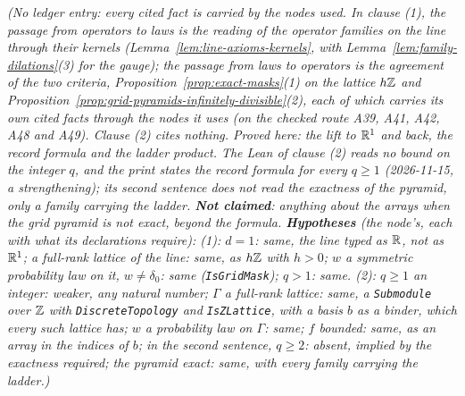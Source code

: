 \begin{proposition}[the line, and the arrays]
\statusT\quad\emph{(No ledger entry: every cited fact is carried by the nodes used. In clause (1),
the passage from operators to laws is the reading of the operator families on the line through
their kernels (Lemma~\ref{lem:line-axioms-kernels}, with Lemma~\ref{lem:family-dilations}(3) for
the gauge); the passage from laws to operators is the agreement of the two criteria,
Proposition~\ref{prop:exact-masks}(1) on the lattice $h\mathbb{Z}$ and
Proposition~\ref{prop:grid-pyramids-infinitely-divisible}(2), each of which carries its own cited
facts through the nodes it uses (on the checked route A39, A41, A42, A48 and A49). Clause (2) cites nothing. Proved
here: the lift to $\mathbb{R}^1$ and back, the record formula and the ladder product. The Lean of
clause (2) reads no bound on the integer $q$, and the print states the record formula for every
$q \ge 1$ (2026-11-15, a strengthening); its second sentence does not read the exactness
of the pyramid, only a family carrying the ladder. \textbf{Not claimed}: anything about the arrays
when the grid pyramid is not exact, beyond the formula.
\textbf{Hypotheses} (the node's, each with what its declarations require): (1): $d = 1$: same, the line
typed as $\mathbb{R}$, not as $\mathbb{R}^1$; a full-rank lattice of the line: same, as $h\mathbb{Z}$ with $h > 0$; $w$ a
symmetric probability law on it, $w \ne \delta_0$: same (\texttt{IsGridMask}); $q > 1$: same. (2):
$q \ge 1$ an integer: weaker, any natural number; $\Gamma$ a full-rank lattice: same, a
\texttt{Submodule} over $\mathbb{Z}$ with \texttt{DiscreteTopology} and \texttt{IsZLattice}, with a basis
$b$ as a binder, which every such lattice has; $w$ a probability law on $\Gamma$: same; $f$ bounded:
same, as an array in the indices of $b$; in the second sentence, $q \ge 2$: absent, implied by the
exactness required; the pyramid exact: same, with every family carrying the ladder.)}
\end{proposition}

